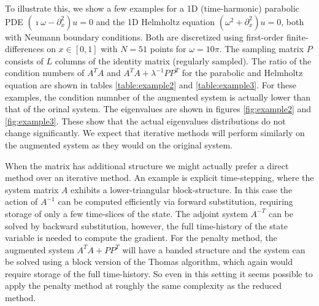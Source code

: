 \documentclass{iopart}
\begin{document}
{To illustrate this, we show a few examples for a 1D (time-harmonic) parabolic PDE $\left(\imath\omega - \partial_x^2\right)u = 0$ and the 1D Helmholtz equation $\left(\omega^2 + \partial_x^2\right)u = 0$, both with Neumann boundary conditions. Both are discretized using first-order finite-differences on $x \in [0,1]$ with $N=51$ points for $\omega = 10\pi$. The sampling matrix $P$ consists of $L$ columns of the identity matrix (regularly sampled). The ratio of the condition numbers of $A^TA$ and $A^TA + \lambda^{-1}PP^T$ for the parabolic and Helmholtz equation are shown in tables \ref{table:example2} and \ref{table:example3}. For these examples, the condition numnber of the augmented system is actually lower than that of the orinal system. The eigenvalues 
are shown in figures \ref{fig:example2} and \ref{fig:example3}. These show that the actual eigenvalues distributions do not change significantly. We expect
that iterative methods will perform similarly on the augmented system as they would on the original system.

When the matrix has additional structure we might actually prefer a direct method over an iterative method. An example is explicit time-stepping, where the system matrix $A$ exhibits a lower-triangular block-structure. In this case the action of $A^{-1}$ can be computed efficiently via forward substitution, requiring storage of only a few time-slices of the state. The adjoint system $A^{-T}$ can be solved by backward substitution, however, the full time-history of the state variable is needed to compute the gradient.
For the penalty method, the augmented system $A^TA + PP^T$ will have a banded structure and the system can be solved using a block version of the Thomas algorithm, which again would require storage of the full time-history. So even in this setting it seems possible to apply the penalty method at roughly the same complexity as the reduced method.

}
\end{document}
